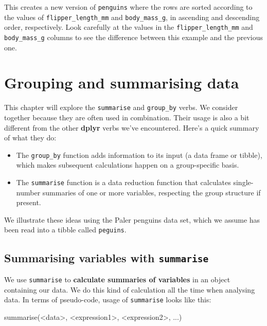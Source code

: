 \documentclass[
]{book}
\newenvironment{Shaded}{\begin{snugshade}}{\end{snugshade}}
\newcommand{\FunctionTok}[1]{\textcolor[rgb]{0.00,0.00,0.00}{#1}}
\newcommand{\NormalTok}[1]{#1}
\newcommand{\SpecialCharTok}[1]{\textcolor[rgb]{0.00,0.00,0.00}{#1}}
\begin{document}
This creates a new version of \texttt{penguins} where the rows are sorted according to the values of \texttt{flipper\_length\_mm} and \texttt{body\_mass\_g}, in ascending and descending order, respectively. Look carefully at the values in the \texttt{flipper\_length\_mm} and \texttt{body\_mass\_g} columns to see the difference between this example and the previous one.

\hypertarget{grouping-and-summarising-data}{%
\chapter{Grouping and summarising data}\label{grouping-and-summarising-data}}

This chapter will explore the \texttt{summarise} and \texttt{group\_by} verbs. We consider together because they are often used in combination. Their usage is also a bit different from the other \textbf{dplyr} verbs we've encountered. Here's a quick summary of what they do:

\begin{itemize}
\item
  The \texttt{group\_by} function adds information to its input (a data frame or tibble), which makes subsequent calculations happen on a group-specific basis.
\item
  The \texttt{summarise} function is a data reduction function that calculates single-number summaries of one or more variables, respecting the group structure if present.
\end{itemize}

We illustrate these ideas using the Paler penguins data set, which we assume has been read into a tibble called \texttt{peguins}.

\hypertarget{summarising-variables-with-summarise}{%
\section{\texorpdfstring{Summarising variables with \texttt{summarise}}{Summarising variables with summarise}}\label{summarising-variables-with-summarise}}

We use \texttt{summarise} to \textbf{calculate summaries of variables} in an object containing our data. We do this kind of calculation all the time when analysing data. In terms of pseudo-code, usage of \texttt{summarise} looks like this:

\begin{Shaded}
\begin{Highlighting}[]
\FunctionTok{summarise}\NormalTok{(}\SpecialCharTok{\textless{}}\NormalTok{data}\SpecialCharTok{\textgreater{}}\NormalTok{, }\SpecialCharTok{\textless{}}\NormalTok{expression1}\SpecialCharTok{\textgreater{}}\NormalTok{, }\SpecialCharTok{\textless{}}\NormalTok{expression2}\SpecialCharTok{\textgreater{}}\NormalTok{, ...)}
\end{Highlighting}
\end{Shaded}
\end{document}
